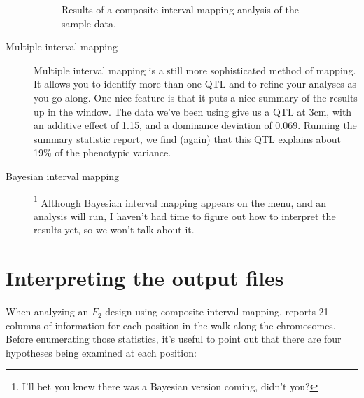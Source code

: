\begin{description}
\begin{figure}
\begin{center}
\end{center}
\caption{Results of a composite interval mapping analysis of the
  sample data.}\label{fig:qtl-composite-results}
\end{figure}

\item[Multiple interval mapping] Multiple interval mapping is a still
  more sophisticated method of mapping. It allows you to identify more
  than one QTL and to refine your analyses as you go along. One nice
  feature is that it puts a nice summary of the results up in the
  window. The data we've been using give us a QTL at 3cm, with an
  additive effect of 1.15, and a dominance deviation of
  0.069. Running the summary statistic report, we find (again) that
  this QTL explains about 19\% of the phenotypic variance.

\item[Bayesian interval mapping]\footnote{I'll bet you knew there was
  a Bayesian version coming, didn't you?} Although Bayesian interval
  mapping appears on the menu, and an analysis will run, I haven't had
  time to figure out how to interpret the results yet, so we won't
  talk about it.

\end{description}

\section*{Interpreting the output files}

When analyzing an $F_2$ design using composite interval mapping,
\qtl{} reports 21 columns of information for each position in the walk
along the chromosomes. Before enumerating those statistics, it's
useful to point out that there are four hypotheses being examined at
each position:

